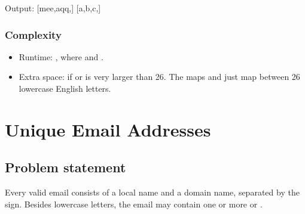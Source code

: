 \documentclass[letterpaper,12pt,english]{book}
\begin{document}
\begin{sphinxVerbatim}[commandchars=\\\{\}]
Output:
[mee,aqq,]
[a,b,c,]
\end{sphinxVerbatim}


\subsubsection{Complexity}
\label{\detokenize{String/08_STR_890_Find_and_Replace_Pattern:complexity}}\begin{itemize}
\item {} 
\sphinxAtStartPar
Runtime: , where  and .

\item {} 
\sphinxAtStartPar
Extra space:  if  or  is very larger than 26. The maps  and  just map between 26 lowercase English letters.

\end{itemize}

\sphinxstepscope


\section{Unique Email Addresses}
\label{\detokenize{String/08_STR_929_Unique_Email_Addresses:unique-email-addresses}}\label{\detokenize{String/08_STR_929_Unique_Email_Addresses::doc}}

\subsection{Problem statement\sphinxfootnotemark[38]}
\label{\detokenize{String/08_STR_929_Unique_Email_Addresses:problem-statement}}%
\begin{footnotetext}[38]\sphinxAtStartFootnote
{}
%
\end{footnotetext}\ignorespaces 
\sphinxAtStartPar
Every valid email consists of a local name and a domain name, separated by the  sign. Besides lowercase letters, the email may contain one or more  or \sphinxcode{\sphinxupquote{\textquotesingle{}+\textquotesingle{}}}.
\end{document}
